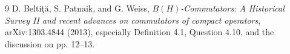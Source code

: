 \documentclass[11pt]{article}
\newcommand{\1}{\mathbf 1}
\begin{document}
\begin{thebibliography}{9}
D. Belti\c t\u a, S. Patnaik, and G. Weiss,
\emph{$B(H)$-Commutators: A Historical Survey II and recent advances on
commutators of compact operators}, arXiv:1303.4844 (2013), especially
Definition 4.1, Question 4.10, and the discussion on pp. 12--13.
\end{thebibliography}
\end{document}
